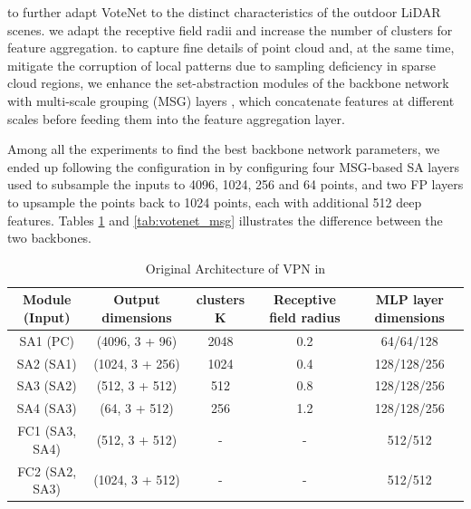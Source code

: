 \documentclass[10pt,twocolumn,letterpaper]{article}
\begin{document}
to further adapt VoteNet to the distinct characteristics of the outdoor LiDAR scenes. we adapt the receptive field radii and increase the number of clusters for feature aggregation. to capture fine details of point cloud and, at the same time, mitigate  the corruption of local patterns due to sampling deficiency in sparse cloud regions, we enhance the set-abstraction modules of the backbone network with multi-scale grouping (MSG) layers \cite{pointnet++}, which concatenate features at different scales before feeding them into the feature aggregation layer.

Among all the experiments to find the best backbone network parameters, we ended up following the configuration in \cite{RCNN paper} by configuring four MSG-based SA layers used to subsample the inputs to 4096, 1024, 256 and 64 points, and two FP layers to upsample the points back to 1024 points, each with additional 512 deep features. Tables \ref{tab:votenet_oringinal} and \ref{tab:votenet_msg} illustrates the difference between the two backbones.


\begin{table}
\label{tab:votenet_oringinal}
\begin{center}
\begin{tabular}{|c|c|c|c|c|}
\hline
Module (Input) & Output dimensions & clusters K & Receptive field radius & MLP layer dimensions \\
\hline\hline
SA1 (PC) & (4096, 3 + 96) & 2048 & 0.2 & 64/64/128 \\
SA2 (SA1) & (1024, 3 + 256) & 1024 & 0.4 & 128/128/256 \\
SA3 (SA2) & (512, 3 + 512) & 512 & 0.8 & 128/128/256 \\
SA4 (SA3) & (64, 3 + 512) & 256 & 1.2 & 128/128/256 \\
FC1 (SA3, SA4) & (512, 3 + 512) & - & - & 512/512 \\
FC2 (SA2, SA3) & (1024, 3 + 512) & - & - & 512/512 \\
\hline
\end{tabular}
\end{center}
\caption{Original Architecture of VPN in \cite{votenet paper}}
\end{table}
\end{document}
